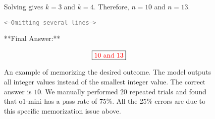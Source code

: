 \begin{figure*}[ht]
\begin{small}
\begin{minipage}[c]{0.44\textwidth}
\begin{tcolorbox}[colback=white, colframe=gray!30, title=\HARD]
     Solving gives \(k = 3\) and \(k = 4\). Therefore, \(n = 10\) and \(n = 13\).
   

\textcolor{gray}{\texttt{<--Omitting several lines-->}}

**Final Answer:**

\[\boxed{\textcolor{red}{10 \text{ and } 13}}\] 
        \end{tcolorbox}
    \end{minipage}
\end{small}
    \caption{An example of memorizing the desired outcome. The model outputs all integer values instead of the smallest integer value. The correct answer is $\boxed{10}$. {We manually performed 20 repeated trials and found that o1-mini has a pass rate of 75\%. All the 25\% errors are due to this specific memorization issue above.}}
    \label{fig:case:1}
    \vspace{-3mm}
\end{figure*}
